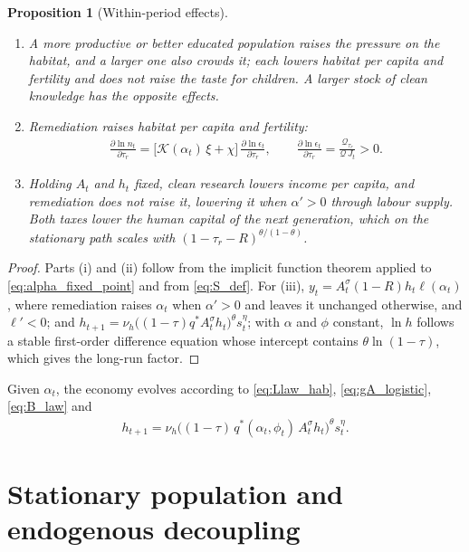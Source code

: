 \documentclass[11pt]{article}
\newtheorem{proposition}{Proposition}
\begin{document}
\begin{proposition}[Within-period effects]
\label{prop:tax}
\begin{enumerate}
\item[(i)] A more productive or better educated population raises the pressure on the habitat, and a
larger one also crowds it; each lowers habitat per capita and fertility and does not raise the taste for
children. A larger stock of clean knowledge has the opposite effects.
\item[(ii)] Remediation raises habitat per capita and fertility:
\begin{align}
\frac{\partial\ln n_t}{\partial\tau_r}=\big[\mathcal{K}(\alpha_t)\,\xi+\chi\big]\,
\frac{\partial\ln\epsilon_t}{\partial\tau_r},
\qquad
\frac{\partial\ln\epsilon_t}{\partial\tau_r}=\frac{\mathcal{Q}_{\tau_r}}{\mathcal{Q}\,J_t}>0 .
\label{eq:dn_dtau}
\end{align}
\item[(iii)] Holding $A_t$ and $h_t$ fixed, clean research lowers income per capita, and remediation
does not raise it, lowering it when $\alpha'>0$ through labour supply. Both taxes lower the human capital of
the next generation, which on the stationary path scales with $(1-\tau_r-R)^{\theta/(1-\theta)}$.
\end{enumerate}
\end{proposition}

\begin{proof}
Parts (i) and (ii) follow from the implicit function theorem applied to \eqref{eq:alpha_fixed_point}
and from \eqref{eq:S_def}. For (iii), $y_t=A_t^{\sigma}(1-R)h_t\ell(\alpha_t)$, where remediation
raises $\alpha_t$ when $\alpha'>0$ and leaves it unchanged otherwise, and $\ell'<0$; and
$h_{t+1}=\nu_h\big((1-\tau)q^\ast A_t^{\sigma}h_t\big)^{\theta}s_t^{\eta}$; with $\alpha$ and $\phi$ constant,
$\ln h$ follows a stable first-order difference equation whose intercept contains
$\theta\ln(1-\tau)$, which gives the long-run factor.
\end{proof}

Given $\alpha_t$, the economy evolves according to \eqref{eq:Llaw_hab}, \eqref{eq:gA_logistic},
\eqref{eq:B_law} and
\begin{align}
h_{t+1}=\nu_h\big((1-\tau)\,q^\ast(\alpha_t,\phi_t)\,A_t^{\sigma}h_t\big)^{\theta}s_t^{\eta}.
\label{eq:h_tax_dyn}
\end{align}

\section{Stationary population and endogenous decoupling}
\label{sec:theory}
\label{sec:timecost}
\label{sec:endog_env}
\end{document}
